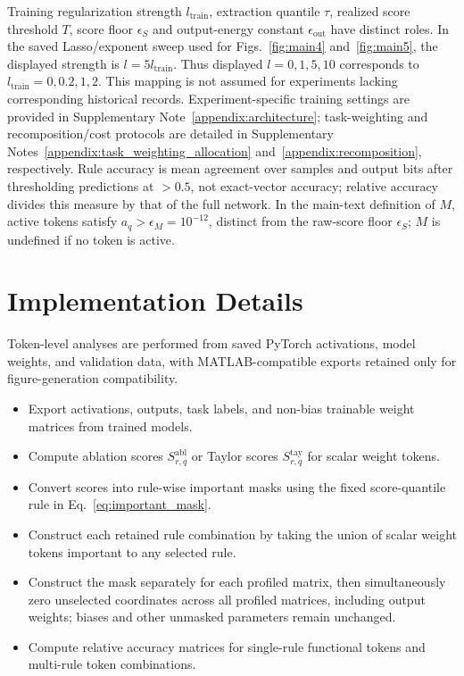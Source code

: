 \documentclass{article}
\begin{document}
Training regularization strength $l_{\mathrm{train}}$, extraction quantile $\tau$, realized score threshold $T$, score floor $\epsilon_S$ and output-energy constant $\epsilon_{\mathrm{out}}$ have distinct roles. In the saved Lasso/exponent sweep used for Figs.~\ref{fig:main4} and~\ref{fig:main5}, the displayed strength is $l=5l_{\mathrm{train}}$. Thus displayed $l=0,1,5,10$ corresponds to $l_{\mathrm{train}}=0,0.2,1,2$. This mapping is not assumed for experiments lacking corresponding historical records. Experiment-specific training settings are provided in Supplementary Note~\ref{appendix:architecture}; task-weighting and recomposition/cost protocols are detailed in Supplementary Notes~\ref{appendix:task_weighting_allocation} and~\ref{appendix:recomposition}, respectively. Rule accuracy is mean agreement over samples and output bits after thresholding predictions at $>0.5$, not exact-vector accuracy; relative accuracy divides this measure by that of the full network. In the main-text definition of $M$, active tokens satisfy $a_q>\epsilon_M=10^{-12}$, distinct from the raw-score floor $\epsilon_S$; $M$ is undefined if no token is active.

\section{Implementation Details}
\label{appendix:implementation}

Token-level analyses are performed from saved PyTorch activations, model weights, and validation data, with MATLAB-compatible exports retained only for figure-generation compatibility.

\begin{itemize}
    \item Export activations, outputs, task labels, and non-bias trainable weight matrices from trained models.
    \item Compute ablation scores $S^{\mathrm{abl}}_{r,q}$ or Taylor scores $S^{\mathrm{tay}}_{r,q}$ for scalar weight tokens.
    \item Convert scores into rule-wise important masks using the fixed score-quantile rule in Eq.~\ref{eq:important_mask}.
    \item Construct each retained rule combination by taking the union of scalar weight tokens important to any selected rule.
    \item Construct the mask separately for each profiled matrix, then simultaneously zero unselected coordinates across all profiled matrices, including output weights; biases and other unmasked parameters remain unchanged.
    \item Compute relative accuracy matrices for single-rule functional tokens and multi-rule token combinations.
\end{itemize}
\end{document}
